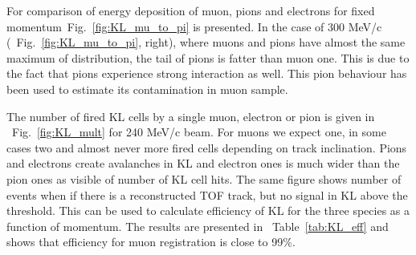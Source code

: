 For comparison of energy deposition of muon, pions and electrons for fixed momentum~Fig.~\ref{fig:KL_mu_to_pi} is presented. In the case of 300 MeV/c (~Fig.~\ref{fig:KL_mu_to_pi}, right), where muons and pions have almost the same maximum of distribution, the tail of pions is fatter than muon one. This is due to the fact that pions experience strong interaction as well. This pion behaviour has been used to estimate its contamination in muon sample. 

The number of fired KL cells by a single muon, electron or pion is given in ~Fig.~\ref{fig:KL_mult} for 240 MeV/c beam. For muons we expect one, in some cases two and almost never more fired cells depending on track inclination. Pions and electrons create avalanches in KL and electron ones is much wider than the pion ones as visible of number of KL cell hits. The same figure shows number of events when if there is a reconstructed TOF track, but no signal in KL above the threshold. This can be used to calculate efficiency of KL for the three species as a function of momentum. The results are presented in ~Table~\ref{tab:KL_eff} and shows that efficiency for muon registration is close to 99$\%$.


 

